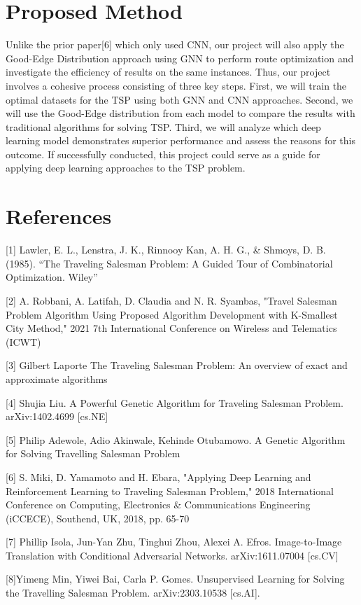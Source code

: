 \documentclass{article}
\begin{document}
\section{Proposed Method}
Unlike the prior paper[6] which only used CNN, our project will also apply the Good-Edge Distribution approach using GNN to perform route optimization and investigate the efficiency of results on the same instances. Thus, our project involves a cohesive process consisting of three key steps. First, we will train the optimal datasets for the TSP using both GNN and CNN approaches. Second, we will use the Good-Edge distribution from each model to compare the results with traditional algorithms for solving TSP. Third, we will analyze which deep learning model demonstrates superior performance and assess the reasons for this outcome. If successfully conducted, this project could serve as a guide for applying deep learning approaches to the TSP problem.



\newpage
\section*{References}


{
\small


[1] Lawler, E. L., Lenstra, J. K., Rinnooy Kan, A. H. G., & Shmoys, D. B. (1985). “The Traveling Salesman Problem: A Guided Tour of Combinatorial Optimization. Wiley” 
 
[2] A. Robbani, A. Latifah, D. Claudia and N. R. Syambas, "Travel Salesman Problem Algorithm Using Proposed Algorithm Development with K-Smallest City Method," 2021 7th International Conference on Wireless and Telematics (ICWT)
 
[3] Gilbert Laporte The Traveling Salesman Problem: An overview of exact and approximate algorithms
 
[4] Shujia Liu. A Powerful Genetic Algorithm for Traveling Salesman Problem. arXiv:1402.4699 [cs.NE]
 
[5] Philip Adewole, Adio Akinwale, Kehinde Otubamowo. A Genetic Algorithm for Solving Travelling Salesman Problem
 
[6]  S. Miki, D. Yamamoto and H. Ebara, "Applying Deep Learning and Reinforcement Learning to Traveling Salesman Problem," 2018 International Conference on Computing, Electronics & Communications Engineering (iCCECE), Southend, UK, 2018, pp. 65-70
 
[7] Phillip Isola, Jun-Yan Zhu, Tinghui Zhou, Alexei A. Efros. Image-to-Image Translation with Conditional Adversarial Networks. arXiv:1611.07004 [cs.CV]
 
[8]Yimeng Min, Yiwei Bai, Carla P. Gomes. Unsupervised Learning for Solving the Travelling Salesman Problem. arXiv:2303.10538 [cs.AI].
}

\end{document}
